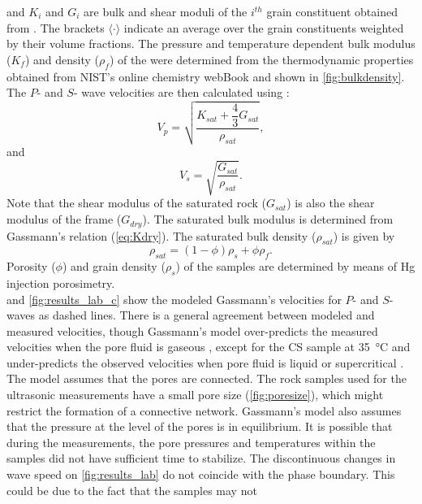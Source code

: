 and $K_i$ and $G_i$ are bulk and shear moduli of the $i^{th}$ grain constituent
obtained from \cite{Mavko2009}. The brackets $\langle \cdot \rangle$ indicate an
average over the grain constituents weighted by their volume fractions. The
pressure and temperature dependent bulk modulus ($K_f$) and density ($\rho_f$)
of the  were determined from the thermodynamic properties obtained from
NIST’s online chemistry webBook \citep{Lemmon2014} and shown in
\cref{fig:bulkdensity}. The $P$- and $S$- wave velocities are then calculated
using \citep{Geertsma1961}:
\begin{equation}
\label{eq:Vp}
V_p = \sqrt{\dfrac{K_{sat}+\dfrac{4}{3}G_{sat}}{\rho_{sat}}},
\end{equation}
and
\begin{equation}
\label{eq:Vs}
V_s = \sqrt{\dfrac{G_{sat}}{\rho_{sat}}}.
\end{equation}
Note that the shear modulus of the saturated rock ($G_{sat}$) is also the shear
modulus of the frame ($G_{dry}$). The saturated bulk modulus is determined from
Gassmann's relation (\cref{eq:Kdry}). The saturated bulk density ($\rho_{sat}$)
is given by
\begin{equation}
\label{eq:rhosat}
\rho_{sat} = (1-\phi)\rho_s + \phi \rho_f.
\end{equation}
Porosity ($\phi$) and grain density ($\rho_s$) of the samples are determined by
means of Hg injection porosimetry.\\
 and \cref{fig:results_lab_c} show the modeled
Gassmann's velocities for $P$- and $S$- waves as dashed lines. There is a
general agreement between modeled and measured velocities, though Gassmann's
model over-predicts the measured velocities when the pore fluid is gaseous
, except for the CS sample at \SI{35}{\degreeCelsius} and under-predicts
the observed velocities when pore fluid is liquid or supercritical .\\
The model assumes that the pores are connected. The rock samples used for the
ultrasonic measurements have a small pore size (\cref{fig:poresize}), which
might restrict the formation of a connective network.
Gassmann's model also assumes that the pressure at the level of the pores is in
equilibrium. It is possible that during the measurements, the pore pressures and
temperatures within the samples did not have sufficient time to stabilize. The
discontinuous changes in wave speed on \cref{fig:results_lab} do not coincide
with the phase boundary. This could be due to the fact that the samples may not
